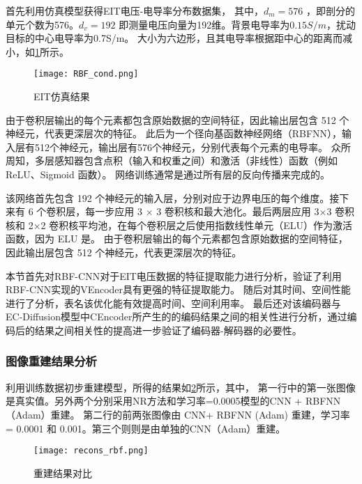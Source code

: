 首先利用仿真模型获得EIT电压-电导率分布数据集，
其中，$d_m =  576$ ，即剖分的单元个数为576。$d_v = 192$ 即测量电压向量为192维。背景电导率为$0.15S/m$，扰动目标的中心电导率为0.7S/m。
大小为六边形，且其电导率根据距中心的距离而减小，如\cref{figure:RBF_cond}所示。
\begin{figure}[h]
    \centering
    \texttt{[image: RBF\_cond.png]}
    \caption{EIT仿真结果}
    \label{figure:RBF_cond}
\end{figure}

由于卷积层输出的每个元素都包含原始数据的空间特征，因此输出层包含 512 个神经元，代表更深层次的特征。
此后为一个径向基函数神经网络（RBFNN），输入层有512个神经元，输出层有576个神经元，分别代表每个元素的电导率。
众所周知，多层感知器包含点积（输入和权重之间）和激活（非线性）函数（例如 ReLU、Sigmoid 函数）。
网络训练通常是通过所有层的反向传播来完成的。


该网络首先包含 192 个神经元的输入层，分别对应于边界电压的每个维度。接下来有 6 个卷积层，每一步应用 3 × 3 卷积核和最大池化。最后两层应用 3×3 卷积核和 2×2 卷积核平均池，在每个卷积层之后使用指数线性单元（ELU）作为激活函数，因为 ELU 是。
由于卷积层输出的每个元素都包含原始数据的空间特征，因此输出层包含 512 个神经元，代表更深层次的特征。


本节首先对RBF-CNN对于EIT电压数据的特征提取能力进行分析，验证了利用RBF-CNN实现的VEncoder具有更强的特征提取能力。
随后对其时间、空间性能进行了分析，表名该优化能有效提高时间、空间利用率。
最后还对该编码器与EC-Diffusion模型中CEncoder所产生的的编码结果之间的相关性进行分析，通过编码后的结果之间相关性的提高进一步验证了编码器-解码器的必要性。
\subsubsection{图像重建结果分析}
利用训练数据初步重建模型，所得的结果如\cref{figure:recons_rbf}所示，其中，
第一行中的第一张图像是真实值。另外两个分别采用NR方法和学习率=0.0005模型的CNN + RBFNN（Adam）重建。
第二行的前两张图像由 CNN+ RBFNN (Adam) 重建，学习率 = 0.0001 和 0.001。第三个则则是由单独的CNN（Adam）重建。
\begin{figure}[h]
    \centering
    
    \texttt{[image: recons\_rbf.png]}
    
    \caption{重建结果对比}
    \label{figure:recons_rbf}
\end{figure}

